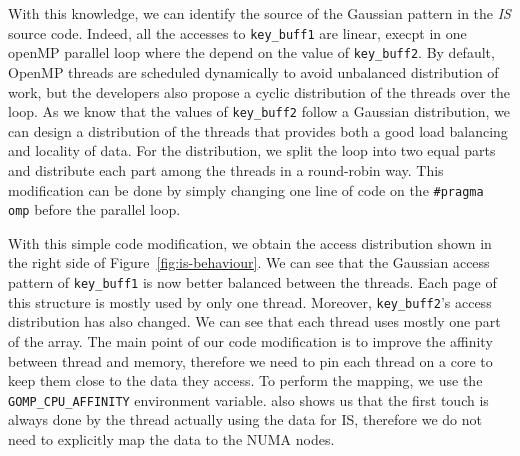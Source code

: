 %


With this knowledge, we can identify the source of the
Gaussian pattern in the \emph{IS} source code. Indeed, all the accesses to \texttt{key\_buff1} are linear,
execpt in one openMP parallel loop where the depend on the value of
\texttt{key\_buff2}.
By default, OpenMP threads are scheduled dynamically to avoid unbalanced
distribution of work, but the developers also propose a cyclic distribution
of the threads over the loop. As we know that the values of \texttt{key\_buff2}
follow a Gaussian distribution, we can design a distribution of the threads that
provides both a good load balancing and locality of data. For the distribution, we split
the loop into two equal parts and distribute each part among the threads in a round-robin way.
This modification can be done by simply changing one line of code on the
\texttt{\#pragma omp} before the parallel loop.



With this simple code modification, we obtain the access distribution
shown in the right side of Figure~\ref{fig:is-behaviour}. We can see that the Gaussian
access pattern of \texttt{key\_buff1} is now better balanced between the threads. Each page
of this structure is mostly used by only one thread. Moreover,
\texttt{key\_buff2}'s access distribution has also changed. We can see that
each thread uses mostly one part of the array.
The main point of our code modification is to improve the affinity between
thread and memory, therefore we need to pin each thread on a core to keep them
close to the data they access. To perform the mapping, we use the \texttt{GOMP\_CPU\_AFFINITY} environment variable. \TABARNAC
also shows us that the first touch is always done by the thread actually using
the data for IS, therefore we do not need to explicitly map the data to the NUMA nodes.

